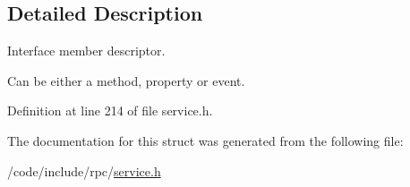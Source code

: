 \subsection{Detailed Description}
Interface member descriptor.

Can be either a method, property or event. 

Definition at line 214 of file service.\+h.



The documentation for this struct was generated from the following file\+:\begin{DoxyCompactItemize}
\item 
/code/include/rpc/\hyperlink{service_8h}{service.\+h}\end{DoxyCompactItemize}
